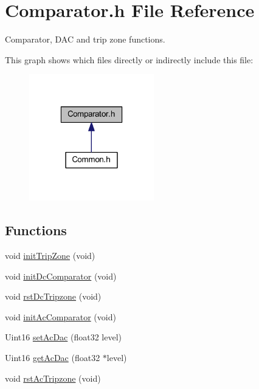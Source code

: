 \hypertarget{a00017}{\section{Comparator.\-h File Reference}
\label{a00017}
}


Comparator, D\-A\-C and trip zone functions.  


This graph shows which files directly or indirectly include this file\-:\nopagebreak
\begin{figure}[H]
\begin{center}
\leavevmode
\includegraphics[width=154pt]{a00063}
\end{center}
\end{figure}
\subsection*{Functions}
\begin{DoxyCompactItemize}
\item 
void \hyperlink{a00017_a027da8e86de2dad92525a72406aca07b}{init\-Trip\-Zone} (void)
\item 
void \hyperlink{a00017_a7e69a8a85db8232ec6da973ef2861a5c}{init\-Dc\-Comparator} (void)
\item 
void \hyperlink{a00017_ae510122953eb2f6575eff63c4c0c6ae8}{rst\-Dc\-Tripzone} (void)
\item 
void \hyperlink{a00017_afac946d62f0f80d9c51a4e90a3b761a5}{init\-Ac\-Comparator} (void)
\item 
Uint16 \hyperlink{a00017_a4744ecd2e5380acd0df217952ca6db0d}{set\-Ac\-Dac} (float32 level)
\item 
Uint16 \hyperlink{a00017_a1d9a18a29a555d85f70597ff1d15c5de}{get\-Ac\-Dac} (float32 $\ast$level)
\item 
void \hyperlink{a00017_aa8b3c8342231e037104a6100df56b11b}{rst\-Ac\-Tripzone} (void)
\end{DoxyCompactItemize}


